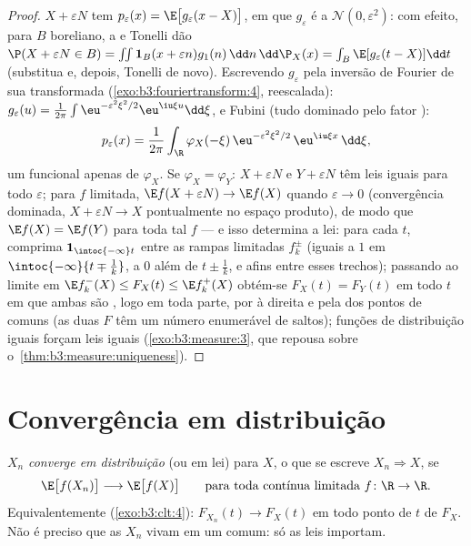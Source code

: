 \begin{proof}
$X + \varepsilon N$ tem  $p_\varepsilon(x) =
\E\bigl[g_\varepsilon(x - X)\bigr]$, em que $g_\varepsilon$ é a  $\mathcal N(0, \varepsilon^2)$: com efeito, para
$B$ boreliano, a  e Tonelli dão $\P(X + \varepsilon N \in
B) = \int\!\!\int\mathbf 1_B(x + \varepsilon
n)g_1(n)\,\dd n\,\dd\P_X(x) = \int_B\E[g_\varepsilon(t -
X)]\dd t$ (substitua e, depois,
Tonelli de novo). Escrevendo $g_\varepsilon$ pela inversão de Fourier de sua
transformada (\cref{exo:b3:fouriertransform:4}, reescalada): $g_\varepsilon(u) = \frac1{2\pi}\int
\eu^{-\varepsilon^2\xi^2/2}\eu^{\iu\xi u}\dd\xi$, e Fubini (tudo dominado
pelo fator ):
\[
p_\varepsilon(x) = \frac1{2\pi}\int_\R
\varphi_X(-\xi)\,\eu^{-\varepsilon^2\xi^2/2}\,
\eu^{\iu\xi x}\,\dd\xi ,
\]
um funcional apenas de $\varphi_X$. Se $\varphi_X =
\varphi_Y$: $X + \varepsilon N$ e $Y + \varepsilon N$ têm leis iguais para
todo $\varepsilon$; para $f$  limitada, $\E f(X + \varepsilon N) \to \E f(X)$ quando $\varepsilon
\to 0$ (convergência
dominada, $X + \varepsilon N \to X$ pontualmente no espaço produto), de modo que $\E f(X) = \E f(Y)$ para
toda tal $f$ --- e isso determina a lei: para cada $t$, comprima
$\mathbf 1_{\intoc{-\infty}t}$ entre as rampas  limitadas $f_k^\pm$ (iguais a $1$ em $\intoc{-\infty}{t \mp \frac1k}$, a
$0$ além de $t \pm
\frac1k$, e afins entre esses trechos); passando ao limite em
$\E
f_k^-(X) \leq F_X(t) \leq \E f_k^+(X)$ obtém-se $F_X(t) =
F_Y(t)$ em todo $t$ em que ambas são , logo em
toda parte, por  à direita e pela  dos pontos de
 comuns (as duas $F$ têm um número enumerável de saltos);
funções de distribuição iguais forçam leis iguais (\cref{exo:b3:measure:3}, que
repousa sobre o~\cref{thm:b3:measure:uniqueness}).
\end{proof}

\section{Convergência em distribuição}

\begin{definition}\label{def:b3:clt:cid}
$X_n$ \emph{converge em distribuição} (ou em lei) para $X$, o que
se escreve $X_n \Rightarrow X$, se
\[
\E\bigl[f(X_n)\bigr] \longrightarrow \E\bigl[f(X)\bigr]
\qquad\text{para toda contínua limitada } f\colon\R\to\R .
\]
Equivalentemente (\cref{exo:b3:clt:4}): $F_{X_n}(t) \to F_X(t)$ em todo ponto de 
$t$ de $F_X$. Não é preciso que as $X_n$ vivam em um  comum: só as leis importam.
\end{definition}

